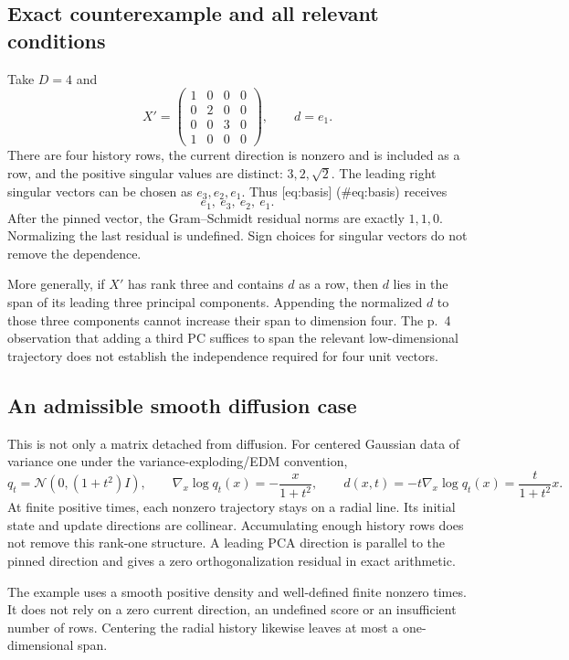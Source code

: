 \documentclass[10pt]{article}
\begin{document}
\subsection*{Exact counterexample and all relevant conditions}
Take \(D=4\) and \[X'=\begin{pmatrix}
 1&0&0&0\\
 0&2&0&0\\
 0&0&3&0\\
 1&0&0&0
 \end{pmatrix},
 \qquad d=e_1.\] There are four history rows, the current direction is nonzero and is included as a row, and the positive singular values are distinct: \(3,2,\sqrt2\). The leading right singular vectors can be chosen as \(e_3,e_2,e_1\). Thus [eq:basis] (\#eq:basis) receives \[e_1,\ e_3,\ e_2,\ e_1.\] After the pinned vector, the Gram–Schmidt residual norms are exactly \(1,1,0\). Normalizing the last residual is undefined. Sign choices for singular vectors do not remove the dependence.\par
More generally, if \(X'\) has rank three and contains \(d\) as a row, then \(d\) lies in the span of its leading three principal components. Appending the normalized \(d\) to those three components cannot increase their span to dimension four. The p. 4 observation that adding a third PC suffices to span the relevant low-dimensional trajectory does not establish the independence required for four unit vectors.\par
\subsection*{An admissible smooth diffusion case}
This is not only a matrix detached from diffusion. For centered Gaussian data of variance one under the variance-exploding/EDM convention, \[q_t=\mathcal N(0,(1+t^2)I),\qquad
 \nabla_x\log q_t(x)=-\frac{x}{1+t^2},\qquad
 d(x,t)=-t\nabla_x\log q_t(x)=\frac{t}{1+t^2}x.\] At finite positive times, each nonzero trajectory stays on a radial line. Its initial state and update directions are collinear. Accumulating enough history rows does not remove this rank-one structure. A leading PCA direction is parallel to the pinned direction and gives a zero orthogonalization residual in exact arithmetic.\par
The example uses a smooth positive density and well-defined finite nonzero times. It does not rely on a zero current direction, an undefined score or an insufficient number of rows. Centering the radial history likewise leaves at most a one-dimensional span.\par
\end{document}
